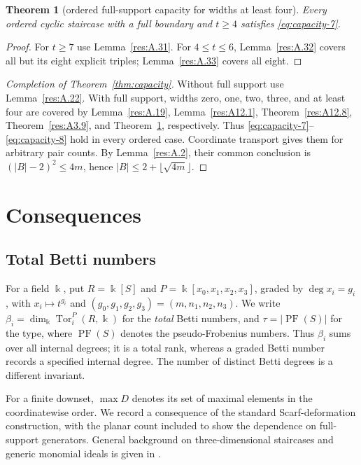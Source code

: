 \documentclass[11pt]{article}
\newtheorem{theorem}{Theorem}[section]
\theoremstyle{definition}
\theoremstyle{remark}
\theoremstyle{plain}
\begin{document}
\begin{theorem}[ordered full-support capacity for widths at least four]\label{res:A.35} Every ordered cyclic staircase with a full boundary and \(t\ge4\) satisfies \eqref{eq:capacity-7}.
\end{theorem}
\begin{proof} For \(t\ge7\) use Lemma~\ref{res:A.31}. For \(4\le t\le6\), Lemma~\ref{res:A.32} covers all but its eight explicit triples; Lemma~\ref{res:A.33} covers all eight. \end{proof}


\begin{proof}[Completion of Theorem~\ref{thm:capacity}]
Without full support use Lemma~\ref{res:A.22}. With full support,
widths zero, one, two, three, and at least four are covered by
Lemma~\ref{res:A.19}, Lemma~\ref{res:A12.1},
Theorem~\ref{res:A12.8}, Theorem~\ref{res:A3.9}, and
Theorem~\ref{res:A.35}, respectively.
Thus \eqref{eq:capacity-7}--\eqref{eq:capacity-8} hold in every ordered case. Coordinate transport
gives them for arbitrary pair counts. By Lemma~\ref{res:A.2}, their
common conclusion is $(|B|-2)^2\le4m$, hence
$|B|\le2+\lfloor\sqrt{4m}\rfloor$.
\end{proof}
\section{Consequences}\label{sec:betti}
\subsection{Total Betti numbers}

For a field $\Bbbk$, put $R=\Bbbk[S]$ and
$P=\Bbbk[x_0,x_1,x_2,x_3]$, graded by $\deg x_i=g_i$, with $x_i\mapsto t^{g_i}$ and
$(g_0,g_1,g_2,g_3)=(m,n_1,n_2,n_3)$.  We write
$\beta_i=\dim_{\Bbbk}\operatorname{Tor}_i^P(R,\Bbbk)$ for the
\emph{total} Betti numbers, and $\tau=|\operatorname{PF}(S)|$ for the type, where $\operatorname{PF}(S)$ denotes the pseudo-Frobenius numbers.
Thus $\beta_i$ sums over all internal degrees; it is a total rank,
whereas a graded Betti number records a specified internal degree.
The number of distinct Betti degrees is a different invariant.

For a finite downset, $\max D$ denotes its set of maximal elements
in the coordinatewise order. We record a consequence of the standard
Scarf-deformation construction, with the planar count included to show
the dependence on full-support generators. General background on
three-dimensional staircases and generic monomial ideals is given in
\cite[Chapters~3 and~6]{MillerSturmfels05}.
\end{document}
